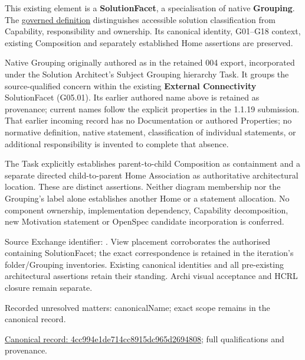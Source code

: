 This existing element is a \textbf{SolutionFacet}, a specialisation of native
\textbf{Grouping}. The \href{\detokenize{../../../../../../../governance/continuum-representation.md#solutionfacet-classification--1119-candidate}}{governed definition}
distinguishes accessible solution classification from Capability, responsibility
and ownership. Its canonical identity, G01–G18 context, existing Composition
and separately established Home assertions are preserved.



Native Grouping originally authored as \texttt{} in the retained 004 export,
incorporated under the Solution Architect's Subject Grouping hierarchy Task.
It groups the source-qualified \texttt{} concern within
the existing \textbf{External Connectivity} SolutionFacet (G05.01). Its earlier authored name above is retained as provenance; current names
follow the explicit properties in the 1.1.19 submission.
That earlier incoming record has no Documentation or authored Properties; no normative
definition, native statement, classification of individual statements, or
additional responsibility is invented to complete that absence.



The Task explicitly establishes parent-to-child Composition as containment and
a separate directed child-to-parent Home Association as authoritative architectural
location. These are distinct assertions. Neither diagram membership nor the
Grouping's label alone establishes another Home or a statement allocation.
No component ownership, implementation dependency, Capability decomposition,
new Motivation statement or OpenSpec candidate incorporation is conferred.



Source Exchange identifier: \texttt{}. View placement corroborates
the authorised containing SolutionFacet; the exact correspondence is retained in the
iteration's folder/Grouping inventories. Existing canonical identities and all
pre-existing architectural assertions retain their standing. Archi visual
acceptance and HCRL closure remain separate.


{\small Recorded unresolved matters: canonicalName; exact scope remains in the canonical record.}\par
{\footnotesize \href{../../../../../../../continuum/grouping/4cc994e1de714cc8915dc965d2694808.md}{Canonical record: 4cc994e1de714cc8915dc965d2694808}; full qualifications and provenance.}\par
